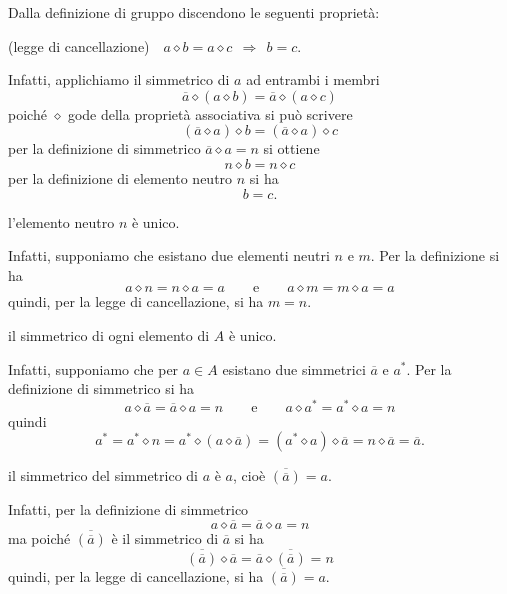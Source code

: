 Dalla definizione di gruppo discendono le seguenti proprietà:
\begin{itemize*}
\item (legge di cancellazione)~~$a\diamond b=a\diamond c \:\:\Rightarrow\:\: b=c$.

Infatti, applichiamo il simmetrico di $a$ ad entrambi i membri
\[\overline{a} \diamond (a \diamond b) = \overline{a} \diamond (a \diamond c)\]
poiché $\diamond$ gode della proprietà associativa si può scrivere
\[(\overline{a} \diamond a) \diamond b = (\overline{a} \diamond a) \diamond c\]
per la definizione di simmetrico $\overline{a} \diamond a = n$ si ottiene
\[n \diamond b = n \diamond c\]
per la definizione di elemento neutro $n$ si ha
\[b = c.\]

\item l'elemento neutro $n$ è unico.

Infatti, supponiamo che esistano due elementi neutri $n$ e $m$. Per la definizione si ha
\[a \diamond n = n \diamond a = a \qquad\text{e}\qquad a \diamond m = m \diamond a = a\]
quindi, per la legge di cancellazione, si ha $m=n$.

\item il simmetrico di ogni elemento di $A$ è unico.

Infatti, supponiamo che per $a \in A$ esistano due simmetrici $\overline{a}$ e $a^*$. Per la definizione di simmetrico si ha
\[a \diamond \overline{a} = \overline{a} \diamond a = n\qquad\text{e}\qquad a \diamond a^* = a^* \diamond a = n\]
quindi
\[a^*=a^* \diamond n = a^* \diamond (a \diamond \overline{a}) = (a^* \diamond a) \diamond \overline{a} = n \diamond \overline{a} = \overline{a}.\]

\item il simmetrico del simmetrico di $a$ è $a$, cioè $\overline{(\overline{a})} = a$.

Infatti, per la definizione di simmetrico
\[a \diamond \overline{a} = \overline{a} \diamond a = n\]
ma poiché $\overline{(\overline{a})}$ è il simmetrico di $\overline{a}$ si ha
\[\overline{(\overline{a})} \diamond \overline{a} = \overline{a} \diamond \overline{(\overline{a})} = n\]
quindi, per la legge di cancellazione, si ha $\overline{(\overline{a})} = a$.
\end{itemize*}


